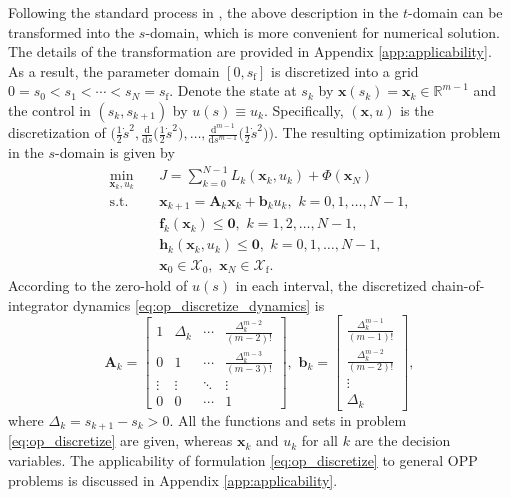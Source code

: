 \documentclass[journal]{IEEEtran}
\theoremstyle{definition}
\theoremstyle{definition}
\newcommand\R{{\mathbb{R}}}
\newcommand\st{{\text{s.t.}}}
\renewcommand\vector[1]{\boldsymbol{#1}}
\newcommand\vb{{\vector{b}}}
\newcommand\vf{{\vector{f}}}
\newcommand\vh{{\vector{h}}}
\newcommand\vx{{\vector{x}}}
\newcommand\vA{{\vector{A}}}
\newcommand\vzero{{\vector{0}}}
\begin{document}
Following the standard process in \cite{verscheure2009time,debrouwere2013time}, the above description in the $t$-domain can be transformed into the $s$-domain, which is more convenient for numerical solution. The details of the transformation are provided in Appendix \ref{app:applicability}. As a result, the parameter domain $[0,s_\text{f}]$ is discretized into a grid $0=s_0<s_1<\cdots<s_N=s_\text{f}$. Denote the state at $s_k$ by $\vx(s_k)=\vx_k\in\R^{m-1}$ and the control in $(s_k,s_{k+1})$ by $u(s)\equiv u_k$. Specifically, $(\vx,u)$ is the discretization of $\Big(\frac12\dot{s}^2,\frac{\mathrm{d}}{\mathrm{d}s}\Big(\frac12\dot{s}^2\Big),\dots,\frac{\mathrm{d}^{m-1}}{\mathrm{d}s^{m-1}}\Big(\frac12\dot{s}^2\Big)\Big)$. The resulting optimization problem in the $s$-domain is given by
\begin{subequations}\label{eq:op_discretize}
    \begin{align}
        \min_{\vx_k,u_k} \quad &J = \sum_{k=0}^{N-1} L_k(\vx_k, u_k) + \Phi(\vx_N) \label{eq:op_discretize_objective}\\
        \st \quad & \vx_{k+1} = \vA_k\vx_k + \vb_k u_k, \,\,k=0,1,\ldots,N-1,\label{eq:op_discretize_dynamics} \\
        &\vf_k(\vx_k) \leq \vzero,  \,\,k=1,2,\ldots,N-1, \label{eq:op_discretize_state_constraints}\\
        &\vh_k(\vx_k, u_k) \leq \vzero, \,\,k=0,1,\ldots,N-1,\label{eq:op_discretize_mix_constraints}\\
        &\vx_0\in\mathcal{X}_0, \,\,\vx_N\in\mathcal{X}_\text{f}.
    \end{align}
\end{subequations}
According to the zero-hold of $u(s)$ in each interval, the discretized chain-of-integrator dynamics \eqref{eq:op_discretize_dynamics} is \cite{wang2025time}
\begin{equation}\label{eq:Ab}
    \vA_k=\left[\begin{array}{cccc}
        1 & \Delta_k & \cdots & \frac{\Delta_k^{m-2}}{(m-2)!} \\
        0 & 1 & \cdots & \frac{\Delta_k^{m-3}}{(m-3)!} \\
        \vdots & \vdots & \ddots & \vdots \\
        0 & 0 & \cdots & 1
    \end{array}\right],\,\,\vb_k=\left[\begin{array}{c}
        \frac{\Delta_k^{m-1}}{(m-1)!} \\
        \frac{\Delta_k^{m-2}}{(m-2)!} \\
        \vdots \\
        \Delta_k
    \end{array}\right],
\end{equation}
where $\Delta_k= s_{k+1}-s_{k}>0$. All the functions and sets in problem \eqref{eq:op_discretize} are given, whereas $\vx_k$ and $u_k$ for all $k$ are the decision variables. The applicability of formulation \eqref{eq:op_discretize} to general OPP problems is discussed in Appendix \ref{app:applicability}.
\end{document}
